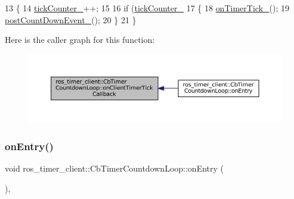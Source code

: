 \begin{DoxyCode}
13 \{
14     \hyperlink{classros__timer__client_1_1CbTimerCountdownLoop_a7f9185e95af1d5be03be20b466122239}{tickCounter\_}++;
15 
16     \textcolor{keywordflow}{if} (\hyperlink{classros__timer__client_1_1CbTimerCountdownLoop_a7f9185e95af1d5be03be20b466122239}{tickCounter\_} %
17     \{
18         \hyperlink{classros__timer__client_1_1CbTimerCountdownLoop_aebbc8d9b3b4f6a6b8b9dd8b46d9264d6}{onTimerTick\_}();
19         \hyperlink{classros__timer__client_1_1CbTimerCountdownLoop_a4ed7025f6f2d7222fe6471a901f134db}{postCountDownEvent\_}();
20     \}
21 \}
\end{DoxyCode}
Here is the caller graph for this function\+:
\nopagebreak
\begin{figure}[H]
\begin{center}
\leavevmode
\includegraphics[width=350pt]{classros__timer__client_1_1CbTimerCountdownLoop_a8b3cbf593a9d3823cd1f56611fb0a0b3_icgraph}
\end{center}
\end{figure}
\mbox{\label{classros__timer__client_1_1CbTimerCountdownLoop_ae547ef69c9ce8029b0f5f27120155c9f}} 
\subsubsection{\texorpdfstring{on\+Entry()}{onEntry()}}
{\footnotesize\ttfamily void ros\+\_\+timer\+\_\+client\+::\+Cb\+Timer\+Countdown\+Loop\+::on\+Entry (\begin{DoxyParamCaption}{ }\end{DoxyParamCaption})\hspace{0.3cm}{\ttfamily [override]}, {\ttfamily [virtual]}}



